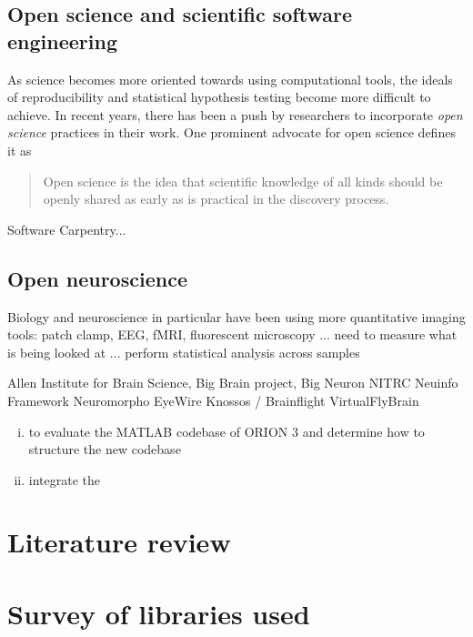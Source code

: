 \subsection{Open science and scientific software engineering}

As science becomes more oriented towards using computational
tools, the ideals of reproducibility and statistical hypothesis
testing become more difficult to achieve. In recent years, there
has been a push by researchers to incorporate \emph{open science}
practices in their work. One prominent advocate for open science
defines it as
\begin{quote}
	\begin{fancyquote}
	Open science is the idea that scientific knowledge of all kinds
	should be openly shared as early as is practical in the discovery
	process.
	\end{fancyquote}
\end{quote}

%



Software Carpentry...


\subsection{Open neuroscience}
Biology and neuroscience in particular have been using more
quantitative imaging tools: patch clamp, EEG, fMRI, fluorescent
microscopy ... need to measure what is being looked at ... perform
statistical analysis across samples

Allen Institute for Brain Science,
Big Brain project,
Big Neuron
NITRC
Neuinfo  Framework
Neuromorpho
EyeWire
Knossos / Brainflight
VirtualFlyBrain
~\citep{FrontNeuroinform:NeuroDebian}

\begin{enumerate}[(i)]
\item to evaluate the MATLAB codebase of ORION 3 and determine how to structure the new codebase
\item integrate the
\end{enumerate}

\section{Literature review}

%

\section{Survey of libraries used}


